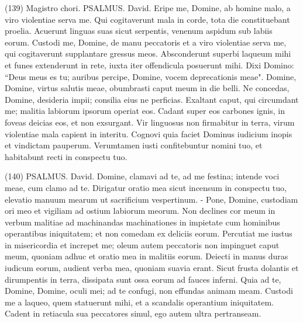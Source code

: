 \begin{biblechapter}  (139) 
\verse  Magistro chori. PSALMUS. David. 
\verse Eripe me, Domine, ab homine malo, a viro violentiae serva me. 
\verse Qui cogitaverunt mala in corde, tota die constituebant proelia. 
\verse Acuerunt linguas suas sicut serpentis, venenum aspidum sub labiis eorum. 
\verse Custodi me, Domine, de manu peccatoris et a viro violentiae serva me, qui cogitaverunt supplantare gressus meos. 
\verse Absconderunt superbi laqueum mihi et funes extenderunt in rete, iuxta iter offendicula posuerunt mihi. 
\verse Dixi Domino: “Deus meus es tu; auribus percipe, Domine, vocem deprecationis meae". 
\verse Domine, Domine, virtus salutis meae, obumbrasti caput meum in die belli. 
\verse Ne concedas, Domine, desideria impii; consilia eius ne perficias. Exaltant 
\verse caput, qui circumdant me; malitia labiorum ipsorum operiat eos. 
\verse Cadant super eos carbones ignis, in foveas deicias eos, et non exsurgant. 
\verse Vir linguosus non firmabitur in terra, virum violentiae mala capient in interitu. 
\verse Cognovi quia faciet Dominus iudicium inopis et vindictam pauperum. 
\verse Verumtamen iusti confitebuntur nomini tuo, et habitabunt recti in conspectu tuo. 
\end{biblechapter}

\begin{biblechapter}  (140) 
\verse  PSALMUS. David. Domine, clamavi ad te, ad me festina; intende voci meae, cum clamo ad te. 
\verse Dirigatur oratio mea sicut incensum in conspectu tuo, elevatio manuum mearum ut sacrificium vespertinum. - 
\verse Pone, Domine, custodiam ori meo et vigiliam ad ostium labiorum meorum. 
\verse Non declines cor meum in verbum malitiae ad machinandas machinationes in impietate cum hominibus operantibus iniquitatem; et non comedam ex deliciis eorum. 
\verse Percutiat me iustus in misericordia et increpet me; oleum autem peccatoris non impinguet caput meum, quoniam adhuc et oratio mea in malitiis eorum. 
\verse Deiecti in manus duras iudicum eorum, audient verba mea, quoniam suavia erant. 
\verse Sicut frusta dolantis et dirumpentis in terra, dissipata sunt ossa eorum ad fauces inferni. 
\verse Quia ad te, Domine, Domine, oculi mei; ad te confugi, non effundas animam meam. 
\verse Custodi me a laqueo, quem statuerunt mihi, et a scandalis operantium iniquitatem. 
\verse Cadent in retiacula sua peccatores simul, ego autem ultra pertranseam. 
\end{biblechapter}

